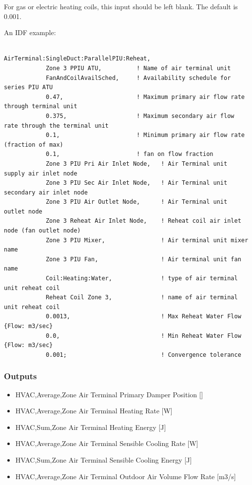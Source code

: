 For gas or electric heating coils, this input should be left blank. The default is 0.001.

An IDF example:

\begin{lstlisting}

AirTerminal:SingleDuct:ParallelPIU:Reheat,
            Zone 3 PPIU ATU,          ! Name of air terminal unit
            FanAndCoilAvailSched,     ! Availability schedule for series PIU ATU
            0.47,                     ! Maximum primary air flow rate through terminal unit
            0.375,                    ! Maximum secondary air flow rate through the terminal unit
            0.1,                      ! Minimum primary air flow rate (fraction of max)
            0.1,                      ! fan on flow fraction
            Zone 3 PIU Pri Air Inlet Node,   ! Air Terminal unit supply air inlet node
            Zone 3 PIU Sec Air Inlet Node,   ! Air Terminal unit secondary air inlet node
            Zone 3 PIU Air Outlet Node,      ! Air Terminal unit outlet node
            Zone 3 Reheat Air Inlet Node,    ! Reheat coil air inlet node (fan outlet node)
            Zone 3 PIU Mixer,                ! Air terminal unit mixer name
            Zone 3 PIU Fan,                  ! Air terminal unit fan name
            Coil:Heating:Water,              ! type of air terminal unit reheat coil
            Reheat Coil Zone 3,              ! name of air terminal unit reheat coil
            0.0013,                          ! Max Reheat Water Flow {Flow: m3/sec}
            0.0,                             ! Min Reheat Water Flow {Flow: m3/sec}
            0.001;                           ! Convergence tolerance
\end{lstlisting}

\subsubsection{Outputs}\label{outputs-8}

\begin{itemize}
\item
  HVAC,Average,Zone Air Terminal Primary Damper Position {[]}
\item
  HVAC,Average,Zone Air Terminal Heating Rate {[}W{]}
\item
  HVAC,Sum,Zone Air Terminal Heating Energy {[}J{]}
\item
  HVAC,Average,Zone Air Terminal Sensible Cooling Rate {[}W{]}
\item
  HVAC,Sum,Zone Air Terminal Sensible Cooling Energy {[}J{]}
\item
  HVAC,Average,Zone Air Terminal Outdoor Air Volume Flow Rate {[}m3/s{]}
\end{itemize}

